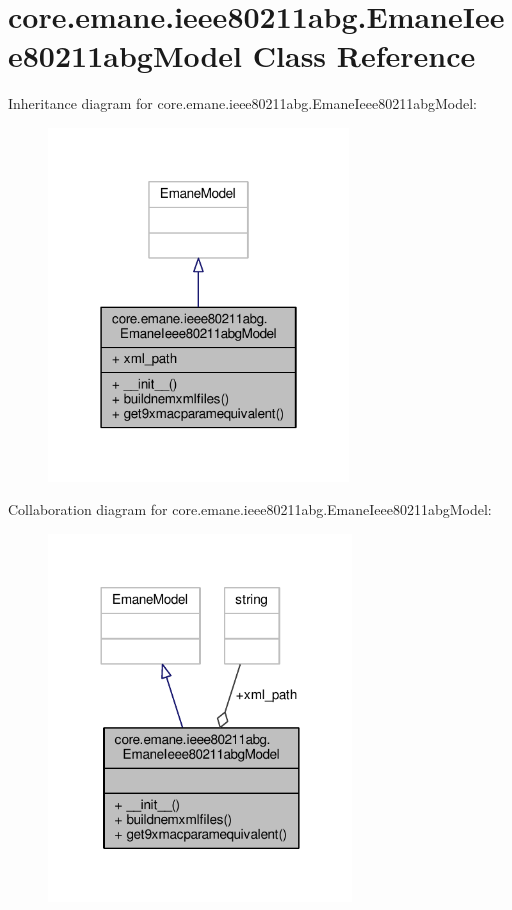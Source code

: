 \hypertarget{classcore_1_1emane_1_1ieee80211abg_1_1_emane_ieee80211abg_model}{\section{core.\+emane.\+ieee80211abg.\+Emane\+Ieee80211abg\+Model Class Reference}
\label{classcore_1_1emane_1_1ieee80211abg_1_1_emane_ieee80211abg_model}
}


Inheritance diagram for core.\+emane.\+ieee80211abg.\+Emane\+Ieee80211abg\+Model\+:
\nopagebreak
\begin{figure}[H]
\begin{center}
\leavevmode
\includegraphics[width=226pt]{classcore_1_1emane_1_1ieee80211abg_1_1_emane_ieee80211abg_model__inherit__graph}
\end{center}
\end{figure}


Collaboration diagram for core.\+emane.\+ieee80211abg.\+Emane\+Ieee80211abg\+Model\+:
\nopagebreak
\begin{figure}[H]
\begin{center}
\leavevmode
\includegraphics[width=228pt]{classcore_1_1emane_1_1ieee80211abg_1_1_emane_ieee80211abg_model__coll__graph}
\end{center}
\end{figure}

